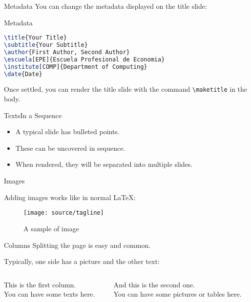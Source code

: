 \documentclass[10pt,aspectratio=169]{beamer}
\begin{document}
\begin{frame}[fragile]{Metadata}
	You can change the metadata displayed on the title slide:

\begin{block}{Metadata}
\begin{lstlisting}[language=TeX]
\title{Your Title}
\subtitle{Your Subtitle}
\author{First Author, Second Author}
\escuela[EPE]{Escuela Profesional de Economia}
\institute[COMP]{Department of Computing}
\date{Date}
\end{lstlisting}
\end{block}

	Once settled, you can render the title slide with the command \verb|\maketitle| in the body.
\end{frame}

\begin{frame}[fragile]{Texts}{In a Sequence}

	\begin{itemize}[<+->]
		\item A typical slide has bulleted points.
		\item These can be uncovered in sequence.
		\item When rendered, they will be separated into multiple slides.
	\end{itemize}

\end{frame}

\begin{frame}{Images}

	Adding images works like in normal \LaTeX:
	
	\begin{figure}[hbt]
		\texttt{[image: source/tagline]}
 		\caption{A sample of image}
	\end{figure}
	
\end{frame}

\begin{frame}{Columns}
	Splitting the page is easy and common.

	Typically, one side has a picture and the other text:
	
	\vspace{20pt}
	
	\begin{columns}
		\begin{column}{0.6\textwidth}
			This is the first column.\\[10pt]
			You can have some texts here.
		\end{column}
		
		\begin{column}{0.3\textwidth}
			And this is the second one.\\[10pt]
			You can have some pictures or tables here.
		\end{column}
	\end{columns}

\end{frame}
\end{document}
